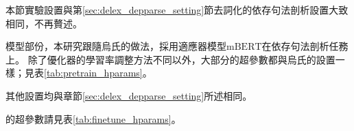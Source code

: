 本節實驗設置與第\ref{sec:delex_depparse_setting}節去詞化的依存句法剖析設置大致相同，不再贅述。


模型部份，本研究跟隨烏氏的做法，採用適應器模型\finetune $\mathrm{mBERT}$在依存句法剖析任務上。
除了優化器的學習率調整方法不同以外，大部分的超參數都與烏氏的設置一樣；見表\ref{tab:pretrain_hparams}。

其他設置均與章節\ref{sec:delex_depparse_setting}所述相同。




\finetune 的超參數請見表\ref{tab:finetune_hparams}。


